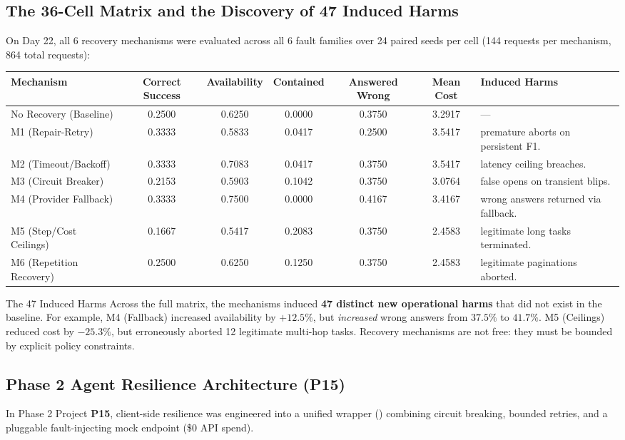 \subsection{The 36-Cell Matrix and the Discovery of 47 Induced Harms}
On Day 22, all 6 recovery mechanisms were evaluated across all 6 fault families over 24 paired seeds per cell (144 requests per mechanism, 864 total requests):
\begin{center}
\small
\begin{tabularx}{\textwidth}{lccccc>{\raggedright\arraybackslash}X}
\toprule
\textbf{Mechanism} & \textbf{Correct Success} & \textbf{Availability} & \textbf{Contained} & \textbf{Answered Wrong} & \textbf{Mean Cost} & \textbf{Induced Harms} \\
\midrule
No Recovery (Baseline) & 0.2500 & 0.6250 & 0.0000 & 0.3750 & 3.2917 & --- \\
M1 (Repair-Retry) & 0.3333 & 0.5833 & 0.0417 & 0.2500 & 3.5417 & 6 premature aborts on persistent F1. \\
M2 (Timeout/Backoff) & 0.3333 & 0.7083 & 0.0417 & 0.3750 & 3.5417 & 6 latency ceiling breaches. \\
M3 (Circuit Breaker) & 0.2153 & 0.5903 & 0.1042 & 0.3750 & 3.0764 & 5 false opens on transient blips. \\
M4 (Provider Fallback) & 0.3333 & 0.7500 & 0.0000 & 0.4167 & 3.4167 & 6 wrong answers returned via fallback. \\
M5 (Step/Cost Ceilings) & 0.1667 & 0.5417 & 0.2083 & 0.3750 & 2.4583 & 12 legitimate long tasks terminated. \\
M6 (Repetition Recovery) & 0.2500 & 0.6250 & 0.1250 & 0.3750 & 2.4583 & 12 legitimate paginations aborted. \\
\bottomrule
\end{tabularx}
\end{center}

\begin{callout}[accent]{The 47 Induced Harms}
Across the full matrix, the mechanisms induced \textbf{47 distinct new operational harms} that did not exist in the baseline. For example, M4 (Fallback) increased availability by $+12.5\%$, but \textit{increased} wrong answers from $37.5\%$ to $41.7\%$. M5 (Ceilings) reduced cost by $-25.3\%$, but erroneously aborted 12 legitimate multi-hop tasks. Recovery mechanisms are not free: they must be bounded by explicit policy constraints.
\end{callout}

\subsection{Phase 2 Agent Resilience Architecture (P15)}
In Phase 2 Project \textbf{P15}, client-side resilience was engineered into a unified wrapper () combining circuit breaking, bounded retries, and a pluggable fault-injecting mock endpoint (\$0 API spend). 

